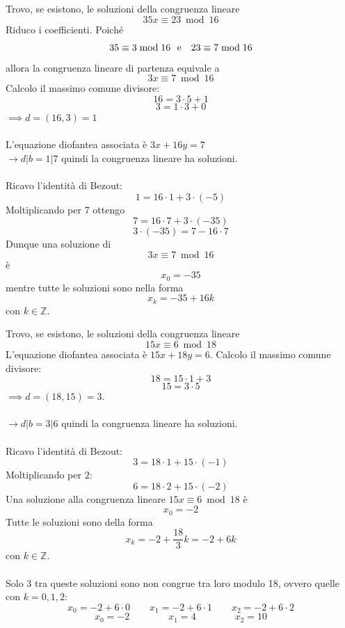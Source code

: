 \documentclass[a4paper,12pt, oneside]{book}
\begin{document}
\begin{shaded}
	\begin{esempio}
		Trovo, se esistono, le soluzioni della congruenza lineare
		$$35x \equiv 23 \bmod 16$$
		Riduco i coefficienti. Poiché $$35 \equiv 3 \bmod 16 \mbox{\space \space e \space \space} 23 \equiv 7 \bmod 16$$
		allora la congruenza lineare di partenza equivale a
		$$3x \equiv 7 \bmod 16$$
		Calcolo il massimo comune divisore:
		$$16 = 3 \cdot 5 + 1$$
		$$3 = 1 \cdot 3 + 0$$
		$\implies d = (16,3) = 1$\\\\
		L'equazione diofantea associata è $3x+16y=7$\\
		$\longrightarrow d|b = 1|7$ quindi la congruenza lineare ha soluzioni.\\\\
		Ricavo l'identità di Bezout:
		$$1 = 16 \cdot 1 + 3 \cdot (-5)$$
		Moltiplicando per $7$ ottengo
		$$7 = 16 \cdot 7 + 3 \cdot (-35)$$
		$$3 \cdot (-35) = 7 - 16 \cdot 7$$
		Dunque una soluzione di $$3x \equiv 7 \bmod 16$$ è
		$$x_0 = -35$$
		mentre tutte le soluzioni sono nella forma
		$$x_k = -35 + 16k$$ con $k \in \mathbb{Z}$.
	\end{esempio}
	\begin{esempio}
		Trovo, se esistono, le soluzioni della congruenza lineare
		$$15x \equiv 6 \bmod 18$$
		L'equazione diofantea associata è $15x+18y=6$.
		Calcolo il massimo comune divisore:
		$$18 = 15 \cdot 1 + 3$$
		$$15 = 3 \cdot 5$$
		$\implies d = (18,15) = 3$.\\\\
		$\longrightarrow d|b = 3|6$ quindi la congruenza lineare ha soluzioni.\\\\
		Ricavo l'identità di Bezout:
		$$3 = 18 \cdot 1 + 15 \cdot (-1)$$
		Moltiplicando per $2$:
		$$6 = 18 \cdot 2 + 15 \cdot (-2)$$
		Una soluzione alla congruenza lineare $15x \equiv 6 \bmod 18$ è
		$$x_0 = -2$$
		Tutte le soluzioni sono della forma
		$$x_k = -2 + \frac{18}{3}k = -2 +6k$$ con $k \in \mathbb{Z}$.\\\\
		Solo $3$ tra queste soluzioni sono non congrue tra loro modulo 18, ovvero quelle con $k = 0,1,2$:
		$$x_0 = -2+6 \cdot 0 \qquad x_1 = -2+6 \cdot 1 \qquad x_2 = -2+6 \cdot 2$$
		$$x_0 = -2 \qquad\qquad x_1 = 4 \qquad\qquad x_2 = 10$$
	\end{esempio}
\end{shaded}
\end{document}

